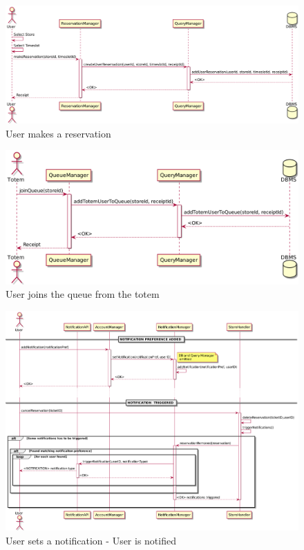 \begin{figure}[H]
    \includegraphics[width=\linewidth]{uml/seq_make_reservation.png}
    \caption{User makes a reservation}
    \label{fig:seq_make_reservation}
\end{figure}
 
\begin{figure}[H]
    \includegraphics[width=\linewidth]{uml/seq_join_queue_totem.png}
    \caption{User joins the queue from the totem}
    \label{fig:seq_join_queue_totem}
\end{figure}

\begin{figure}[H]
    \includegraphics[width=\linewidth]{uml/seq_user_gets_notified.png}
    \caption{User sets a notification - User is notified}
    \label{fig:seq_user_gets_notified}
\end{figure}

